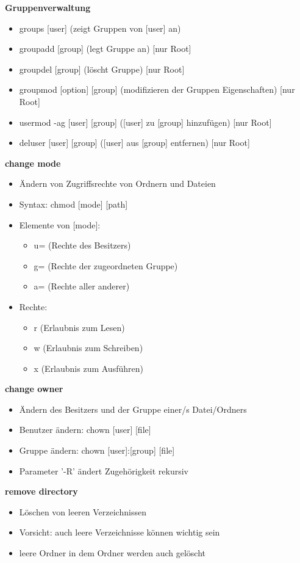 \documentclass[12pt,utf8, 10pt]{article}
\begin{document}
\textbf{Gruppenverwaltung}
\begin{itemize}
	\item groups [user] (zeigt Gruppen von [user] an)
	\item groupadd [group] (legt Gruppe an) [nur Root]
	\item groupdel [group] (löscht Gruppe)  [nur Root]
	\item groupmod [option] [group] (modifizieren der Gruppen Eigenschaften) [nur Root]
	\item usermod -ag [user] [group] ([user] zu [group] hinzufügen) [nur Root]
	\item deluser [user] [group] ([user] aus [group] entfernen) [nur Root]
\end{itemize}

\textbf{change mode}
\begin{itemize}
	\item Ändern von Zugriffsrechte von Ordnern und Dateien
	\item Syntax: chmod [mode] [path]
	\item Elemente von [mode]:
	\begin{itemize}
		\item u= (Rechte des Besitzers)
		\item g= (Rechte der zugeordneten Gruppe)
		\item a= (Rechte aller anderer)
	\end{itemize}	 
	\item Rechte:
	\begin{itemize}
		\item r (Erlaubnis zum Lesen)
		\item w (Erlaubnis zum Schreiben)
		\item x (Erlaubnis zum Ausführen)
	\end{itemize}
\end{itemize}

\textbf{change owner}
\begin{itemize}
	\item Ändern des Besitzers und der Gruppe einer/s Datei/Ordners
	\item Benutzer ändern: chown [user] [file]
	\item Gruppe ändern: chown [user]:[group] [file]
	\item Parameter '-R' ändert Zugehörigkeit rekursiv
\end{itemize}

\textbf{remove directory}
\begin{itemize}
	\item Löschen von leeren Verzeichnissen
	\item Vorsicht: auch leere Verzeichnisse können wichtig sein
	\item leere Ordner in dem Ordner werden auch gelöscht
\end{itemize}
\end{document}
